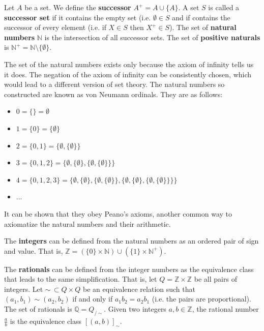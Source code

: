 \documentclass{article}
\begin{document}
\begin{defn}\label{defn_successor_set}
	Let $A$ be a set. We define the \textbf{successor} $A^+ = A \cup \{A\}$. A set $S$ is called a \textbf{successor set} if it contains the empty set (i.e. $\emptyset \in S$ and if contains the successor of every element (i.e. if $X \in S$ then $X^+ \in S$). The set of \textbf{natural numbers} $\mathbb{N}$ is the intersection of all successor sets. The set of \textbf{positive naturals} is $\mathbb{N}^+ = \mathbb{N} \setminus \{ \emptyset \}$.
\end{defn}
\begin{remark}
	The set of the natural numbers exists only because the axiom of infinity tells us it does. The negation of the axiom of infinity can be consistently chosen, which would lead to a different version of set theory. The natural numbers so constructed are known as von Neumann ordinals. They are as follows:
	\begin{itemize}
		\item $0 = \{ \} = \emptyset$
		\item $1 = \{ 0 \} = \{ \emptyset \}$
		\item $2 = \{0, 1\} = \{ \emptyset, \{ \emptyset\} \}$
		\item $3 = \{0, 1, 2\} = \{ \emptyset, \{ \emptyset\}, \{ \emptyset, \{ \emptyset\} \} \}$
		\item $4 = \{0, 1, 2, 3\} = \{ \emptyset, \{ \emptyset\}, \{ \emptyset, \{ \emptyset\} \}, \{ \emptyset, \{ \emptyset\}, \{ \emptyset, \{ \emptyset\} \} \} \}$
		\item ...
	\end{itemize}
	It can be shown that they obey Peano's axioms, another common way to axiomatize the natural numbers and their arithmetic.
\end{remark}

\begin{defn}
	The \textbf{integers} can be defined from the natural numbers as an ordered pair of sign and value. That is, $\mathbb{Z} = (\{ 0 \} \times \mathbb{N}) \cup (\{ 1 \} \times \mathbb{N}^+)$.
\end{defn}

\begin{defn}
	The \textbf{rationals} can be defined from the integer numbers as the equivalence class that leads to the same simplification. That is, let $Q = \mathbb{Z} \times \mathbb{Z}$ be all pairs of integers. Let $\sim \, \subset Q \times Q$ be an equivalence relation such that $(a_1, b_1) \sim (a_2, b_2)$ if and only if $a_1 b_2 = a_2 b_1$ (i.e. the pairs are proportional). The set of rationals is $\mathbb{Q} = Q_{/\sim}$. Given two integers $a, b \in \mathbb{Z}$, the rational number $\frac{a}{b}$ is the equivalence class $[(a,b)]_{\sim}$.
\end{defn}
\end{document}
